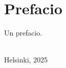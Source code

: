 \chapter{Prefacio}
\label{prefacio:cha}

Un prefacio.

\vspace{1cm}
\begin{flushright}
\textit{\yourName}\\
Helsinki, 2025
\end{flushright}
